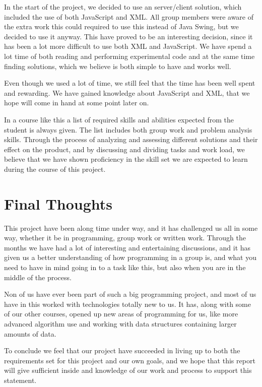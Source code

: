 \documentclass[a4paper,10pt,titlepage]{article}
\begin{document}
In the start of the project, we decided to use an server/client solution, which included the use of both JavaScript and XML. All group members were aware of the extra work this could required to use this instead of Java Swing, but we decided to use it anyway. This have proved to be an interesting decision, since it has been a lot more difficult to use both XML and JavaScript. We have spend a lot time of both reading and performing experimental code and at the same time finding solutions, which we believe is both simple to have and works well.

Even though we used a lot of time, we still feel that the time has been well spent and rewarding. We have gained knowledge about JavaScript and XML, that we hope will come in hand at some point later on.

In a course like this a list of required skills and abilities expected from the student is always given. The list includes both group work and problem analysis skills. Through the process of analyzing and assessing different solutions and their effect on the product, and by discussing and dividing tasks and work load, we believe that we have shown proficiency in the skill set we are expected to learn during the course of this project.

	 
	\newpage
	
	\section{Final Thoughts}
	This project have been along time under way, and it has challenged us all in some way, whether it be in programming, group work or written work. Through the months we have had a lot of interesting and entertaining discussions, and it has given us a better understanding of how programming in a group is, and what you need to have in mind going in to a task like this, but also when you are in the middle of the process.

Non of us have ever been part of such a big programming project, and most of us have in this worked with technologies totally new to us. It has, along with some of our other courses, opened up new areas of programming for us, like more advanced algorithm use and working with data structures containing larger amounts of data.

To conclude we feel that our project have succeeded in living up to both the requirements set for this project and our own goals, and we hope that this report will give sufficient inside and knowledge of our work and process to support this statement.
\end{document}
